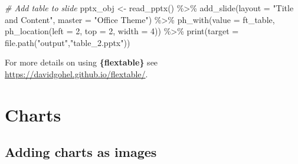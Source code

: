 \documentclass[
]{book}
\newenvironment{Shaded}{\begin{snugshade}}{\end{snugshade}}
\newcommand{\AttributeTok}[1]{\textcolor[rgb]{0.77,0.63,0.00}{#1}}
\newcommand{\CommentTok}[1]{\textcolor[rgb]{0.56,0.35,0.01}{\textit{#1}}}
\newcommand{\DecValTok}[1]{\textcolor[rgb]{0.00,0.00,0.81}{#1}}
\newcommand{\FunctionTok}[1]{\textcolor[rgb]{0.00,0.00,0.00}{#1}}
\newcommand{\NormalTok}[1]{#1}
\newcommand{\OtherTok}[1]{\textcolor[rgb]{0.56,0.35,0.01}{#1}}
\newcommand{\SpecialCharTok}[1]{\textcolor[rgb]{0.00,0.00,0.00}{#1}}
\newcommand{\StringTok}[1]{\textcolor[rgb]{0.31,0.60,0.02}{#1}}
\begin{document}
\begin{Shaded}
\begin{Highlighting}[]
\CommentTok{\# Add table to slide}
\NormalTok{pptx\_obj }\OtherTok{\textless{}{-}} \FunctionTok{read\_pptx}\NormalTok{() }\SpecialCharTok{\%\textgreater{}\%}
  \FunctionTok{add\_slide}\NormalTok{(}\AttributeTok{layout =} \StringTok{"Title and Content"}\NormalTok{, }\AttributeTok{master =} \StringTok{"Office Theme"}\NormalTok{) }\SpecialCharTok{\%\textgreater{}\%}
  \FunctionTok{ph\_with}\NormalTok{(}\AttributeTok{value =}\NormalTok{ ft\_table, }\FunctionTok{ph\_location}\NormalTok{(}\AttributeTok{left =} \DecValTok{2}\NormalTok{, }\AttributeTok{top =} \DecValTok{2}\NormalTok{, }\AttributeTok{width =} \DecValTok{4}\NormalTok{)) }\SpecialCharTok{\%\textgreater{}\%} 
  \FunctionTok{print}\NormalTok{(}\AttributeTok{target =} \FunctionTok{file.path}\NormalTok{(}\StringTok{"output"}\NormalTok{,}\StringTok{"table\_2.pptx"}\NormalTok{))}
\end{Highlighting}
\end{Shaded}

For more details on using \textbf{\{flextable\}} see \url{https://davidgohel.github.io/flextable/}.

\hypertarget{charts}{%
\section{Charts}\label{charts}}

\hypertarget{adding-charts-as-images}{%
\subsection{Adding charts as images}\label{adding-charts-as-images}}
\end{document}

